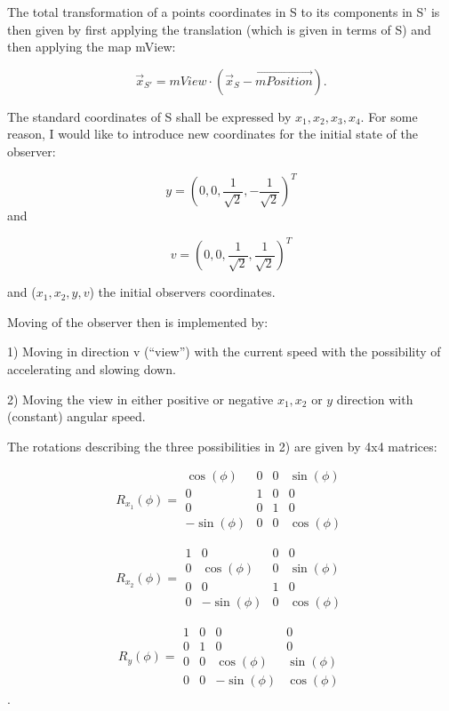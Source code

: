 \documentclass[titlepage]{scrartcl}
\begin{document}
The total transformation of a points coordinates in S to its components in S' is then given by first applying the translation (which is given in terms of S) and then applying the map mView:

\begin{equation}
\vec{x}_{S'} = mView \cdot (\vec{x}_S - \vec{mPosition}).
\end{equation}

The standard coordinates of S shall be expressed by $x_1, x_2, x_3, x_4$. For some reason, I would like to introduce new coordinates for the initial state of the observer: 

\begin{equation}
y = (0, 0, \frac{1}{\sqrt{2}}, -\frac{1}{\sqrt{2}})^T
\end{equation} and

\begin{equation}
v = (0, 0, \frac{1}{\sqrt{2}}, \frac{1}{\sqrt{2}})^T
\end{equation}

and ($x_1, x_2, y, v$) the initial observers coordinates. 

Moving of the observer then is implemented by: 

1) Moving in direction v (\enquote{view}) with the current speed with the possibility of accelerating and slowing down. 

2) Moving the view in either positive or negative $x_1, x_2$ or $y$ direction with (constant) angular speed. 

The rotations describing the three possibilities in 2) are given by 4x4 matrices: 

\begin{equation}
R_{x_1}(\phi) = \begin{array}{cccc}
\cos(\phi) & 0 & 0 & \sin(\phi) \\ 
0 & 1 & 0 & 0 \\ 
0 & 0 & 1 & 0 \\ 
-\sin(\phi) & 0 & 0 & \cos(\phi)
\end{array} 
\end{equation}

\begin{equation}
R_{x_2}(\phi) = \begin{array}{cccc}
1 & 0 & 0 & 0 \\ 
0 & \cos(\phi) & 0 & \sin(\phi) \\ 
0 & 0 & 1 & 0 \\ 
0 & -\sin(\phi) & 0 & \cos(\phi)
\end{array} 
\end{equation}

\begin{equation}
R_{y}(\phi) = \begin{array}{cccc}
1 & 0 & 0 & 0\\ 
0 & 1 & 0 & 0 \\ 
0 & 0 & \cos(\phi) & \sin(\phi) \\ 
0 & 0 & -\sin(\phi) & \cos(\phi)
\end{array} 
\end{equation}.
\end{document}

